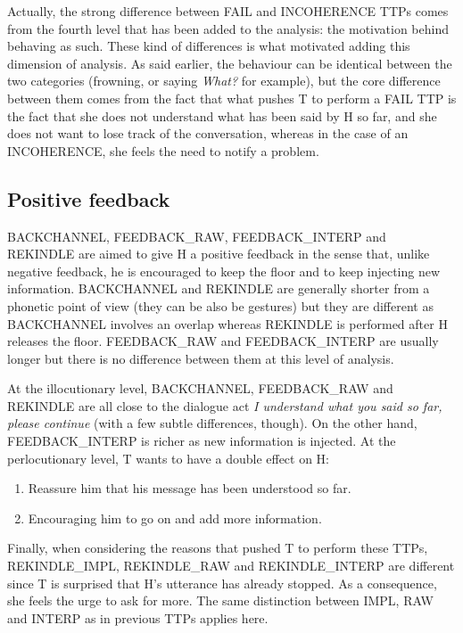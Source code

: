          Actually, the strong difference between FAIL and INCOHERENCE TTPs comes from the fourth level that has been added to the analysis: the motivation behind behaving as such. These kind of differences is what motivated adding this dimension of analysis. As said earlier, the behaviour can be identical between the two categories (frowning, or saying \textit{What?} for example), but the core difference between them comes from the fact that what pushes T to perform a FAIL TTP is the fact that she does not understand what has been said by H so far, and she does not want to lose track of the conversation, whereas in the case of an INCOHERENCE, she feels the need to notify a problem.

    \subsection{Positive feedback}
		
					BACKCHANNEL, FEEDBACK\_RAW, FEEDBACK\_INTERP and REKINDLE are aimed to give H a positive feedback in the sense that, unlike negative feedback, he is encouraged to keep the floor and to keep injecting new information. BACKCHANNEL and REKINDLE are generally shorter from a phonetic point of view (they can be also be gestures) but they are different as BACKCHANNEL involves an overlap whereas REKINDLE is performed after H releases the floor. FEEDBACK\_RAW and FEEDBACK\_INTERP are usually longer but there is no difference between them at this level of analysis.
					
					At the illocutionary level, BACKCHANNEL, FEEDBACK\_RAW and REKINDLE are all close to the dialogue act \textit{I understand what you said so far, please continue} (with a few subtle differences, though). On the other hand, FEEDBACK\_INTERP is richer as new information is injected. At the perlocutionary level, T wants to have a double effect on H:
					\begin{enumerate}
						\item Reassure him that his message has been understood so far.
						\item Encouraging him to go on and add more information.
					\end{enumerate}
					
					Finally, when considering the reasons that pushed T to perform these TTPs, REKINDLE\_IMPL, REKINDLE\_RAW and REKINDLE\_INTERP are different since T is surprised that H's utterance has already stopped. As a consequence, she feels the urge to ask for more. The same distinction between IMPL, RAW and INTERP as in previous TTPs applies here.


